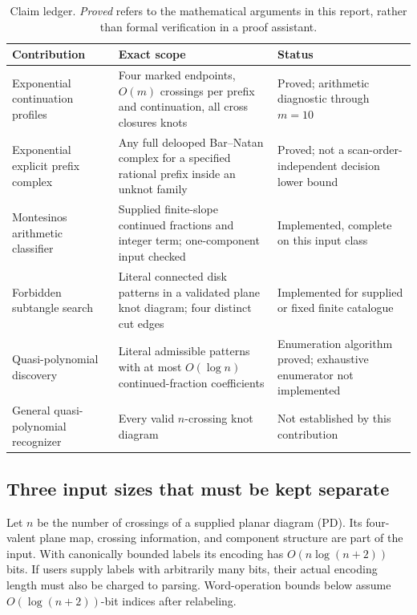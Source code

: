 \documentclass[11pt,a4paper]{article}
\theoremstyle{definition}
\theoremstyle{remark}
\numberwithin{equation}{section}
\begin{document}
\begin{table}[htbp]
\centering\small
\begin{tabularx}{\textwidth}{L{0.25\textwidth}X L{0.21\textwidth}}
\toprule
Contribution & Exact scope & Status\\
\midrule
Exponential continuation profiles &
Four marked endpoints, \(O(m)\) crossings per prefix and continuation,
all cross closures knots &
Proved; arithmetic diagnostic through \(m=10\)\\
\addlinespace
Exponential explicit prefix complex &
Any full delooped Bar--Natan complex for a specified rational prefix
inside an unknot family &
Proved; not a scan-order-independent decision lower bound\\
\addlinespace
Montesinos arithmetic classifier &
Supplied finite-slope continued fractions and integer term; one-component
input checked &
Implemented, complete on this input class\\
\addlinespace
Forbidden subtangle search &
Literal connected disk patterns in a validated plane knot diagram;
four distinct cut edges &
Implemented for supplied or fixed finite catalogue\\
\addlinespace
Quasi-polynomial discovery &
Literal admissible patterns with at most \(O(\log n)\) continued-fraction
coefficients &
Enumeration algorithm proved; exhaustive enumerator not implemented\\
\addlinespace
General quasi-polynomial recognizer &
Every valid \(n\)-crossing knot diagram &
Not established by this contribution\\
\bottomrule
\end{tabularx}
\caption{Claim ledger. \emph{Proved} refers to the mathematical arguments in
this report, rather than formal verification in a proof assistant.}
\label{tab:claims}
\end{table}

\subsection{Three input sizes that must be kept separate}
\label{subsec:input-sizes}

Let \(n\) be the number of crossings of a supplied planar diagram (PD).
Its four-valent plane map, crossing information, and component structure
are part of the input. With canonically bounded labels its encoding has
\(O(n\log(n+2))\) bits. If users supply labels with arbitrarily many bits,
their actual encoding length must also be charged to parsing. Word-operation
bounds below assume \(O(\log(n+2))\)-bit indices after relabeling.
\end{document}
